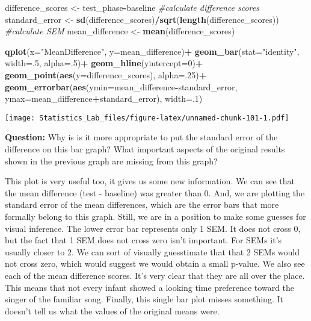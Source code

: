 \documentclass[
]{book}
\newenvironment{Shaded}{\begin{snugshade}}{\end{snugshade}}
\newcommand{\AttributeTok}[1]{\textcolor[rgb]{0.13,0.29,0.53}{#1}}
\newcommand{\CommentTok}[1]{\textcolor[rgb]{0.56,0.35,0.01}{\textit{#1}}}
\newcommand{\DecValTok}[1]{\textcolor[rgb]{0.00,0.00,0.81}{#1}}
\newcommand{\FunctionTok}[1]{\textcolor[rgb]{0.13,0.29,0.53}{\textbf{#1}}}
\newcommand{\NormalTok}[1]{#1}
\newcommand{\OtherTok}[1]{\textcolor[rgb]{0.56,0.35,0.01}{#1}}
\newcommand{\SpecialCharTok}[1]{\textcolor[rgb]{0.81,0.36,0.00}{\textbf{#1}}}
\newcommand{\StringTok}[1]{\textcolor[rgb]{0.31,0.60,0.02}{#1}}
\begin{document}
\begin{Shaded}
\begin{Highlighting}[]
\NormalTok{difference\_scores }\OtherTok{\textless{}{-}}\NormalTok{ test\_phase}\SpecialCharTok{{-}}\NormalTok{baseline }\CommentTok{\#calculate difference scores}
\NormalTok{standard\_error }\OtherTok{\textless{}{-}} \FunctionTok{sd}\NormalTok{(difference\_scores)}\SpecialCharTok{/}\FunctionTok{sqrt}\NormalTok{(}\FunctionTok{length}\NormalTok{(difference\_scores)) }\CommentTok{\#calculate SEM}
\NormalTok{mean\_difference }\OtherTok{\textless{}{-}} \FunctionTok{mean}\NormalTok{(difference\_scores)}

\FunctionTok{qplot}\NormalTok{(}\AttributeTok{x=}\StringTok{"MeanDifference"}\NormalTok{, }\AttributeTok{y=}\NormalTok{mean\_difference)}\SpecialCharTok{+}
  \FunctionTok{geom\_bar}\NormalTok{(}\AttributeTok{stat=}\StringTok{"identity"}\NormalTok{, }\AttributeTok{width=}\NormalTok{.}\DecValTok{5}\NormalTok{, }\AttributeTok{alpha=}\NormalTok{.}\DecValTok{5}\NormalTok{)}\SpecialCharTok{+}
  \FunctionTok{geom\_hline}\NormalTok{(}\AttributeTok{yintercept=}\DecValTok{0}\NormalTok{)}\SpecialCharTok{+}
  \FunctionTok{geom\_point}\NormalTok{(}\FunctionTok{aes}\NormalTok{(}\AttributeTok{y=}\NormalTok{difference\_scores), }\AttributeTok{alpha=}\NormalTok{.}\DecValTok{25}\NormalTok{)}\SpecialCharTok{+}
  \FunctionTok{geom\_errorbar}\NormalTok{(}\FunctionTok{aes}\NormalTok{(}\AttributeTok{ymin=}\NormalTok{mean\_difference}\SpecialCharTok{{-}}\NormalTok{standard\_error, }
                                  \AttributeTok{ymax=}\NormalTok{mean\_difference}\SpecialCharTok{+}\NormalTok{standard\_error), }\AttributeTok{width=}\NormalTok{.}\DecValTok{1}\NormalTok{)}
\end{Highlighting}
\end{Shaded}

\texttt{[image: Statistics\_Lab\_files/figure-latex/unnamed-chunk-101-1.pdf]}

\textbf{Question:} Why is is it more appropriate to put the standard error of the difference on this bar graph? What important aspects of the original results shown in the previous graph are missing from this graph?

This plot is very useful too, it gives us some new information. We can see that the mean difference (test - baseline) was greater than 0. And, we are plotting the standard error of the mean differences, which are the error bars that more formally belong to this graph. Still, we are in a position to make some guesses for visual inference. The lower error bar represents only 1 SEM. It does not cross 0, but the fact that 1 SEM does not cross zero isn't important. For SEMs it's usually closer to 2. We can sort of visually guesstimate that that 2 SEMs would not cross zero, which would suggest we would obtain a small p-value. We also see each of the mean difference scores. It's very clear that they are all over the place. This means that not every infant showed a looking time preference toward the singer of the familiar song. Finally, this single bar plot misses something. It doesn't tell us what the values of the original means were.
\end{document}

